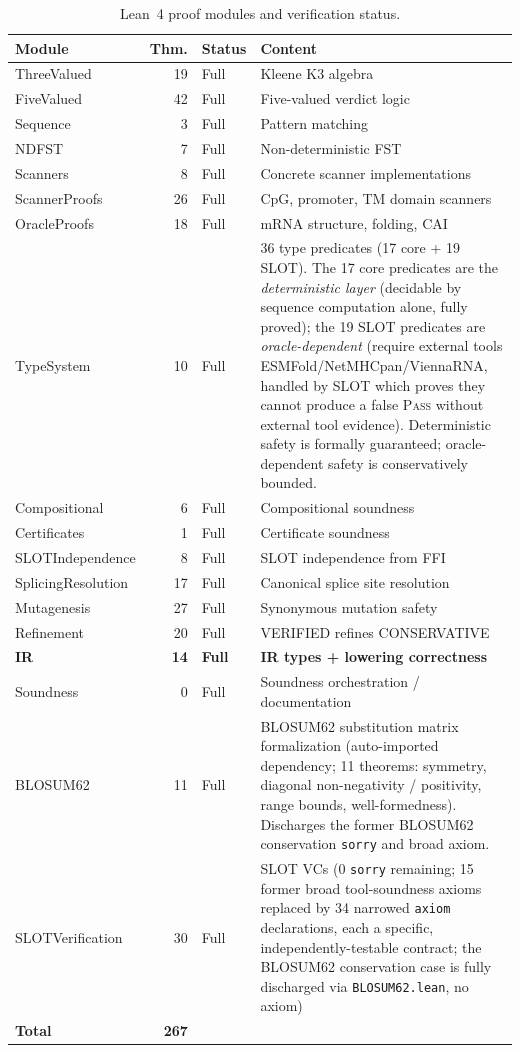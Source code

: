\documentclass[11pt,a4paper]{article}
\theoremstyle{definition}
\newcommand{\PASS}{\textsc{Pass}}
\begin{document}
\begin{table}[!ht]
\centering
\small
\begin{tabularx}{\textwidth}{lr l X}
\toprule
\textbf{Module} & \textbf{Thm.} & \textbf{Status} & \textbf{Content} \\
\midrule
ThreeValued & 19 & Full & Kleene K3 algebra~\cite{kleene1952introduction} \\
FiveValued & 42 & Full & Five-valued verdict logic \\
Sequence & 3 & Full & Pattern matching \\
NDFST & 7 & Full & Non-deterministic FST \\
Scanners & 8 & Full & Concrete scanner implementations \\
ScannerProofs & 26 & Full & CpG, promoter, TM domain scanners \\
OracleProofs & 18 & Full & mRNA structure, folding, CAI \\
TypeSystem & 10 & Full & 36 type predicates (17 core + 19 SLOT). The 17 core predicates are the \emph{deterministic layer} (decidable by sequence computation alone, fully proved); the 19 SLOT predicates are \emph{oracle-dependent} (require external tools ESMFold/NetMHCpan/ViennaRNA, handled by SLOT which proves they cannot produce a false \PASS{} without external tool evidence). Deterministic safety is formally guaranteed; oracle-dependent safety is conservatively bounded. \\
Compositional & 6 & Full & Compositional soundness \\
Certificates & 1 & Full & Certificate soundness \\
SLOTIndependence & 8 & Full & SLOT independence from FFI \\
SplicingResolution & 17 & Full & Canonical splice site resolution \\
Mutagenesis & 27 & Full & Synonymous mutation safety \\
Refinement & 20 & Full & VERIFIED refines CONSERVATIVE \\
\textbf{IR} & \textbf{14} & \textbf{Full} & \textbf{IR types + lowering correctness} \\
Soundness & 0 & Full & Soundness orchestration / documentation \\
BLOSUM62 & 11 & Full & BLOSUM62 substitution matrix formalization (auto-imported dependency; 11 theorems: symmetry, diagonal non-negativity / positivity, range bounds, well-formedness). Discharges the former BLOSUM62 conservation \texttt{sorry} and broad axiom. \\
SLOTVerification & 30 & Full & SLOT VCs (0 \texttt{sorry} remaining; 15 former broad tool-soundness axioms replaced by 34 narrowed \texttt{axiom} declarations, each a specific, independently-testable contract; the BLOSUM62 conservation case is fully discharged via \texttt{BLOSUM62.lean}, no axiom) \\
\midrule
\textbf{Total} & \textbf{267} & & \\
\bottomrule
\end{tabularx}
\caption{Lean~4 proof modules and verification status.}
\label{tab:lean-modules}
\end{table}
\end{document}
